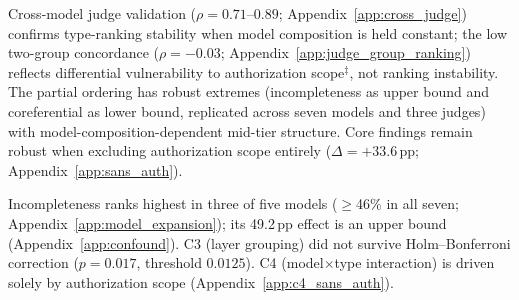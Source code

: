 Cross-model judge validation ($\rho = 0.71$--$0.89$; Appendix~\ref{app:cross_judge}) confirms type-ranking stability when model composition is held constant; the low two-group concordance ($\rho = -0.03$; Appendix~\ref{app:judge_group_ranking}) reflects differential vulnerability to authorization scope$^\ddagger$, not ranking instability. The partial ordering has robust extremes (incompleteness as upper bound and coreferential as lower bound, replicated across seven models and three judges) with model-composition-dependent mid-tier structure. Core findings remain robust when excluding authorization scope entirely ($\Delta = +33.6$\,pp; Appendix~\ref{app:sans_auth}).

Incompleteness ranks highest in three of five models ($\geq$46\% in all seven; Appendix~\ref{app:model_expansion}); its 49.2\,pp effect is an upper bound (Appendix~\ref{app:confound}). C3 (layer grouping) did not survive Holm--Bonferroni correction ($p = 0.017$, threshold $0.0125$). \label{sec:c4}C4 (model$\times$type interaction) is driven solely by authorization scope (Appendix~\ref{app:c4_sans_auth}).

